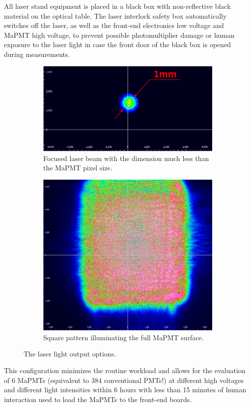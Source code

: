 All laser stand equipment is placed in a black box with non-reflective black material on the optical table. The laser interlock safety box automatically switches off the laser, as well as the front-end electronics low voltage and MaPMT high voltage, to prevent possible photomultiplier damage or human exposure to the laser light in case the front door of the black box is opened during measurements.

\begin{figure}[bt]
	\centering
	\begin{subfigure}[b]{0.628\linewidth}
		\includegraphics[width=\linewidth]{figures/beamspot.pdf}
		\caption{Focused laser beam with the dimension much less than the MaPMT pixel size.}
		\label{fig:beamopt1}
	\end{subfigure}
	\begin{subfigure}[b]{0.354\linewidth}
		\includegraphics[width=\linewidth]{figures/beamsquare.pdf}
		\caption{Square pattern illuminating the full MaPMT surface.}
		\label{fig:beamopt2}
	\end{subfigure}
	\caption{The laser light output options.}
\end{figure}

This configuration minimizes the routine workload and allows for the evaluation of 6 MaPMTs (equivalent to 384 conventional PMTs!) at different high voltages and different light intensities within 6 hours with less than 15 minutes of human interaction used to load the MaPMTs to the front-end boards.

